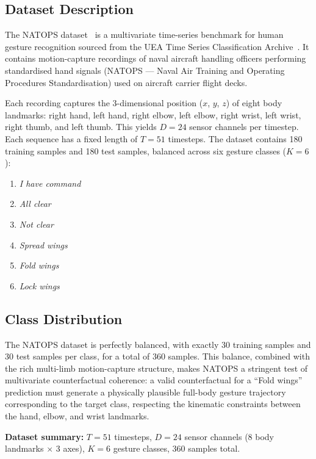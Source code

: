 \subsection{Dataset Description}

The NATOPS dataset~\cite{zhang2011extracting} is a multivariate time-series benchmark for human gesture recognition sourced from the UEA Time Series Classification Archive~\cite{bagnall2018uea}. It contains motion-capture recordings of naval aircraft handling officers performing standardised hand signals (NATOPS — Naval Air Training and Operating Procedures Standardisation) used on aircraft carrier flight decks.

Each recording captures the 3-dimensional position ($x$, $y$, $z$) of eight body landmarks: right hand, left hand, right elbow, left elbow, right wrist, left wrist, right thumb, and left thumb. This yields $D = 24$ sensor channels per timestep. Each sequence has a fixed length of $T = 51$ timesteps. The dataset contains 180 training samples and 180 test samples, balanced across six gesture classes ($K = 6$):

\begin{enumerate}
    \item \textit{I have command}
    \item \textit{All clear}
    \item \textit{Not clear}
    \item \textit{Spread wings}
    \item \textit{Fold wings}
    \item \textit{Lock wings}
\end{enumerate}

\subsection{Class Distribution}

The NATOPS dataset is perfectly balanced, with exactly 30 training samples and 30 test samples per class, for a total of 360 samples. This balance, combined with the rich multi-limb motion-capture structure, makes NATOPS a stringent test of multivariate counterfactual coherence: a valid counterfactual for a ``Fold wings'' prediction must generate a physically plausible full-body gesture trajectory corresponding to the target class, respecting the kinematic constraints between the hand, elbow, and wrist landmarks.

\textbf{Dataset summary:} $T = 51$ timesteps, $D = 24$ sensor channels (8 body landmarks $\times$ 3 axes), $K = 6$ gesture classes, 360 samples total.

